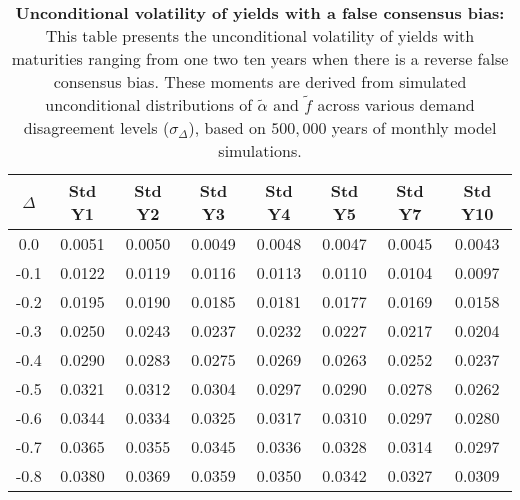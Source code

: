 \begin{table}[h!]
\centering
\caption{\textbf{Unconditional volatility of yields with a false consensus bias:} This table presents the unconditional volatility of yields with maturities ranging from one two ten years when there is a reverse false consensus bias. These moments are derived from simulated unconditional distributions of $\tilde{\alpha}$ and $\tilde{f}$ across various demand disagreement levels ($\sigma_{\Delta}$), based on $500,000$ years of monthly model simulations.}
\begin{tabular}{c|ccccccc}
\hline
$\Delta$ & Std Y1 & Std Y2 & Std Y3 & Std Y4 & Std Y5 & Std Y7 & Std Y10 \\
\hline
0.0   & 0.0051 & 0.0050 & 0.0049 & 0.0048 & 0.0047 & 0.0045 & 0.0043 \\
-0.1  & 0.0122 & 0.0119 & 0.0116 & 0.0113 & 0.0110 & 0.0104 & 0.0097 \\
-0.2  & 0.0195 & 0.0190 & 0.0185 & 0.0181 & 0.0177 & 0.0169 & 0.0158 \\
-0.3  & 0.0250 & 0.0243 & 0.0237 & 0.0232 & 0.0227 & 0.0217 & 0.0204 \\
-0.4  & 0.0290 & 0.0283 & 0.0275 & 0.0269 & 0.0263 & 0.0252 & 0.0237 \\
-0.5  & 0.0321 & 0.0312 & 0.0304 & 0.0297 & 0.0290 & 0.0278 & 0.0262 \\
-0.6  & 0.0344 & 0.0334 & 0.0325 & 0.0317 & 0.0310 & 0.0297 & 0.0280 \\
-0.7  & 0.0365 & 0.0355 & 0.0345 & 0.0336 & 0.0328 & 0.0314 & 0.0297 \\
-0.8  & 0.0380 & 0.0369 & 0.0359 & 0.0350 & 0.0342 & 0.0327 & 0.0309 \\
\hline
\end{tabular}
\end{table} 



